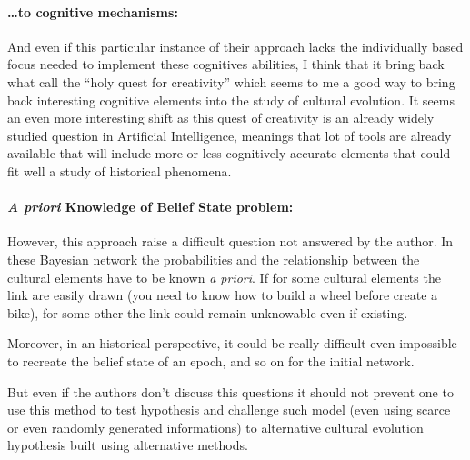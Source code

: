 \documentclass[a4paper]{article}
\begin{document}
\paragraph{\ldots to cognitive mechanisms:\\}
And even if this particular instance of their approach lacks the individually based focus needed to implement these cognitives abilities, I think that it bring back what \cite{pereira2002conceptual} call the ``holy quest for creativity'' which seems to me a good way to bring back interesting cognitive elements into the study of cultural evolution. It seems an even more interesting shift as this quest of creativity is an already widely studied question in Artificial Intelligence, meanings that lot of tools are already available that will include more or less cognitively accurate elements that could fit well a study of historical phenomena.

\paragraph{\emph{A priori} Knowledge of Belief State problem:\\}
However, this approach raise a difficult question not answered by the author. In these Bayesian network the probabilities and the relationship between the cultural elements have to be known \emph{a priori}. If for some cultural elements the link are easily drawn (you need to know how to build a wheel before create a bike), for some other the link could remain unknowable even if existing. 

Moreover, in an historical perspective, it could be really difficult even impossible to recreate the belief state of an epoch, and so on for the initial network. 

But even if the authors don't discuss this questions it should not prevent one to use this method to test hypothesis and challenge such model (even using scarce or even randomly generated informations) to alternative cultural evolution hypothesis built using alternative methods.




  
\end{document}
